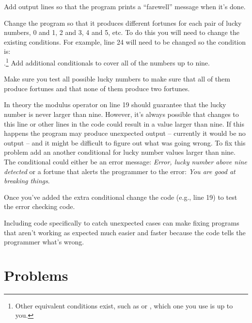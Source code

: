 
Add output lines so that the program prints a ``farewell'' message when it's done.


Change the program so that it produces different fortunes for each pair of lucky numbers, 0 and 1, 2 and 3, 4 and 5, etc.  To do this you will need to change the existing conditions.  For example, line 24 will need to be changed so the condition is:\\
.\footnote{Other equivalent conditions exist, such as 
 or , which one you use is up to you.}
Add additional conditionals to cover all of the numbers up to nine.  

Make sure you test all possible lucky numbers to make sure that all of them produce fortunes and that none of them produce two fortunes.  


In theory the modulus operator on line 19 should guarantee that the lucky number is never larger than nine.  However, it's always possible that changes to this line or other lines in the code could result in a value larger than nine.  If this happens the program may produce unexpected output -- currently it would be no output -- and it might be difficult to figure out what was going wrong.  To fix this problem add an another conditional for lucky number values larger than nine.  The conditional could either be an error message: \emph{Error, lucky number above nine detected} or a fortune that alerts the programmer to the error: \emph{You are good at breaking things}.

Once you've added the extra conditional change the code (e.g., line 19) to test the error checking code.

Including code specifically to catch unexpected cases can make fixing programs that aren't working as expected much easier and faster because the code tells the programmer what's wrong.

\section{Problems}

